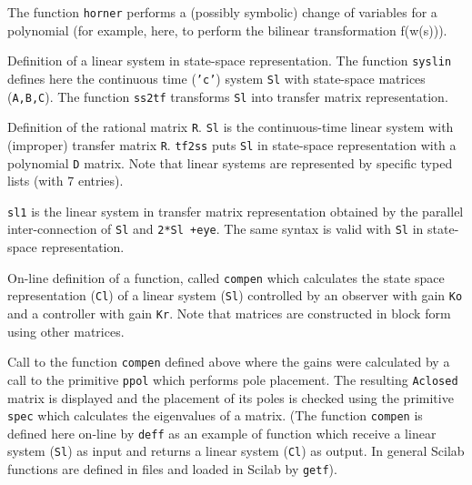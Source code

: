 \noindent\dotfill



The function {\tt horner} performs a (possibly symbolic) change of 
variables for a polynomial (for example, here, to
perform the bilinear transformation f(w(s))).

\noindent\dotfill



Definition of a linear system in state-space representation.
The function {\tt syslin} defines here the continuous time ({\tt 'c'}) system
{\tt Sl} with state-space matrices ({\tt A,B,C}). The function
{\tt ss2tf} transforms {\tt Sl} into transfer matrix representation.

\noindent\dotfill



Definition of the rational matrix {\tt R}. {\tt Sl} is the
continuous-time linear system with (improper) transfer matrix
{\tt R}. {\tt tf2ss} puts {\tt Sl} in state-space representation with a
polynomial {\tt D} matrix. Note that linear systems are represented
by specific typed lists (with 7 entries).

\noindent\dotfill



{\tt sl1} is the linear system in transfer matrix representation
obtained by the parallel inter-connection of {\tt Sl} and {\tt 2*Sl +eye}.
The same syntax is valid with {\tt Sl} in state-space representation.

\noindent\dotfill



On-line definition of a function, called {\tt compen} which calculates the 
state space representation
({\tt Cl}) of a linear system ({\tt Sl}) controlled by an observer
with gain {\tt Ko}
and a controller with gain {\tt Kr}.  Note that matrices are constructed
in block form using other matrices.

\noindent\dotfill



Call to the function {\tt compen} defined above where the gains were
calculated by a call to the primitive {\tt ppol} which performs pole
placement.
The resulting {\tt Aclosed} matrix is displayed and the placement
of its poles is checked using the primitive {\tt spec} which calculates
the eigenvalues of a matrix. (The function {\tt compen} is defined here
on-line by {\tt deff} as an example of function which receive a linear system 
({\tt Sl}) as input and returns a linear system ({\tt Cl}) as output.
In general Scilab functions are defined in files and loaded in Scilab
by {\tt getf}).

